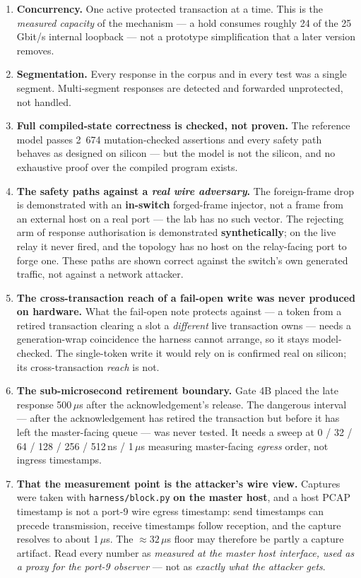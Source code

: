 \documentclass[10pt,a4paper,oneside]{article}
\newcommand{\num}[1]{\mbox{#1}}
\newcommand{\code}[1]{\texttt{\small #1}}
\begin{document}
\begin{enumerate}[leftmargin=1.5em,itemsep=0.25em]
\item \textbf{Concurrency.} One active protected transaction at a time. This is the
  \emph{measured capacity} of the mechanism --- a hold consumes roughly 24 of the
  25\,Gbit/s internal loopback --- not a prototype simplification that a later version
  removes.
\item \textbf{Segmentation.} Every response in the corpus and in every test was a single
  segment. Multi-segment responses are detected and forwarded unprotected, not handled.
\item \textbf{Full compiled-state correctness is checked, not proven.} The reference model
  passes \num{2 674} mutation-checked assertions and every safety path behaves as designed on
  silicon --- but the model is not the silicon, and no exhaustive proof over the compiled
  program exists.
\item \textbf{The safety paths against a \emph{real wire adversary}.} The foreign-frame drop
  is demonstrated with an \textbf{in-switch} forged-frame injector, not a frame from an
  external host on a real port --- the lab has no such vector. The rejecting arm of response
  authorisation is demonstrated \textbf{synthetically}; on the live relay it never fired, and
  the topology has no host on the relay-facing port to forge one. These paths are shown
  correct against the switch's own generated traffic, not against a network attacker.
\item \textbf{The cross-transaction reach of a fail-open write was never produced on
  hardware.} What the fail-open note protects against --- a token from a retired transaction
  clearing a slot a \emph{different} live transaction owns --- needs a generation-wrap
  coincidence the harness cannot arrange, so it stays model-checked. The single-token write it
  would rely on is confirmed real on silicon; its cross-transaction \emph{reach} is not.
\item \textbf{The sub-microsecond retirement boundary.} Gate 4B placed the late
  response 500\,$\mu$s after the acknowledgement's release. The dangerous interval --- after
  the acknowledgement has retired the transaction but before it has left the master-facing
  queue --- was never tested. It needs a sweep at 0 / 32 / 64 / 128 / 256 / 512\,ns /
  1\,$\mu$s measuring master-facing \emph{egress} order, not ingress timestamps.
\item \textbf{That the measurement point is the attacker's wire view.} Captures were
  taken with \code{harness/block.py} \textbf{on the master host}, and a host PCAP timestamp
  is not a port-9 wire egress timestamp: send timestamps can precede transmission, receive
  timestamps follow reception, and the capture resolves to about 1\,$\mu$s. The
  ${\approx}32\,\mu$s floor may therefore be partly a capture artifact. Read every number as
  \emph{measured at the master host interface, used as a proxy for the port-9 observer} ---
  not as \emph{exactly what the attacker gets}.
\end{enumerate}
\end{document}
